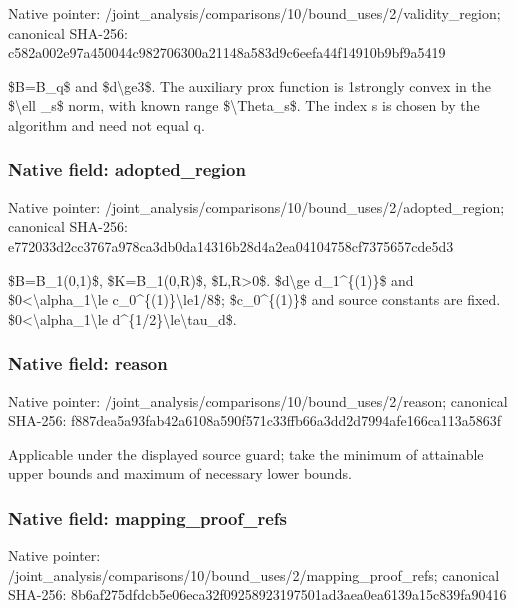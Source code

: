 \documentclass[10pt,a4paper]{article}
\begin{document}
Native pointer: /joint\_analysis/comparis\allowbreak{}ons/10/bound\_uses/2/vali\allowbreak{}dity\_region; canonical SHA-256: c582a002e97a450044c98270\allowbreak{}6300a21148a583d9c6eefa44\allowbreak{}f14910b9bf9a5419


\$B=B\_q\$ and \$d\textbackslash{}ge3\$. The auxiliary prox function is 1strongly convex in the \$\textbackslash{}ell \_s\$ norm, with known range \$\textbackslash{}Theta\_s\$. The index s is chosen by the algorithm and need not equal q.


\subsubsection{Native field: adopted\_region}


Native pointer: /joint\_analysis/comparis\allowbreak{}ons/10/bound\_uses/2/adop\allowbreak{}ted\_region; canonical SHA-256: e772033d2cc3767a978ca3db\allowbreak{}0da14316b28d4a2ea0410475\allowbreak{}8cf7375657cde5d3


\$B=B\_1(0,1)\$, \$K=B\_1(0,R)\$, \$L,R>0\$. \$d\textbackslash{}ge d\_1\textasciicircum{}\{(1)\}\$ and \$0<\textbackslash{}alpha\_1\textbackslash{}le c\_0\textasciicircum{}\{(1)\}\textbackslash{}le1/8\$; \$c\_0\textasciicircum{}\{(1)\}\$ and source constants are fixed. \$0<\textbackslash{}alpha\_1\textbackslash{}le d\textasciicircum{}\{1/2\}\textbackslash{}le\textbackslash{}tau\_d\$.


\subsubsection{Native field: reason}


Native pointer: /joint\_analysis/comparis\allowbreak{}ons/10/bound\_uses/2/reas\allowbreak{}on; canonical SHA-256: f887dea5a93fab42a6108a59\allowbreak{}0f571c33ffb66a3dd2d7994a\allowbreak{}fe166ca113a5863f


Applicable under the displayed source guard; take the minimum of attainable upper bounds and maximum of necessary lower bounds.


\subsubsection{Native field: mapping\_proof\_refs}


Native pointer: /joint\_analysis/comparis\allowbreak{}ons/10/bound\_uses/2/mapp\allowbreak{}ing\_proof\_refs; canonical SHA-256: 8b6af275dfdcb5e06eca32f0\allowbreak{}9258923197501ad3aea0ea61\allowbreak{}39a15c839fa90416
\end{document}
